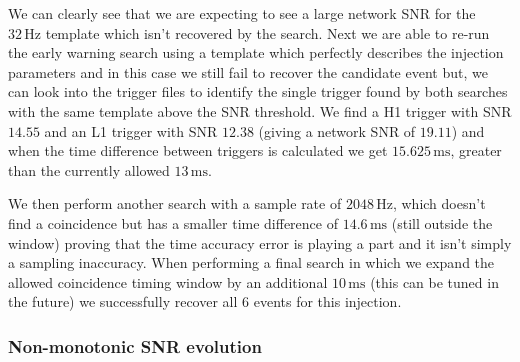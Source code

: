 %
We can clearly see that we are expecting to see a large network SNR for the $32 \, \text{Hz}$ template which isn't recovered by the search. Next we are able to re-run the early warning search using a template which perfectly describes the injection parameters and in this case we still fail to recover the candidate event but, we can look into the trigger files to identify the single trigger found by both searches with the same template above the SNR threshold. We find a H1 trigger with SNR $14.55$ and an L1 trigger with SNR $12.38$ (giving a network SNR of $19.11$) and when the time difference between triggers is calculated we get $15.625 \, \text{ms}$, greater than the currently allowed $13 \, \text{ms}$. 

We then perform another search with a sample rate of $2048 \,\text{Hz}$, which doesn't find a coincidence but has a smaller time difference of $14.6 \, \text{ms}$ (still outside the window) proving that the time accuracy error is playing a part and it isn't simply a sampling inaccuracy. When performing a final search in which we expand the allowed coincidence timing window by an additional $10 \, \text{ms}$ (this can be tuned in the future) we successfully recover all $6$ events for this injection.


\subsubsection{\label{6:sec:non-mono-snr}Non-monotonic SNR evolution}


